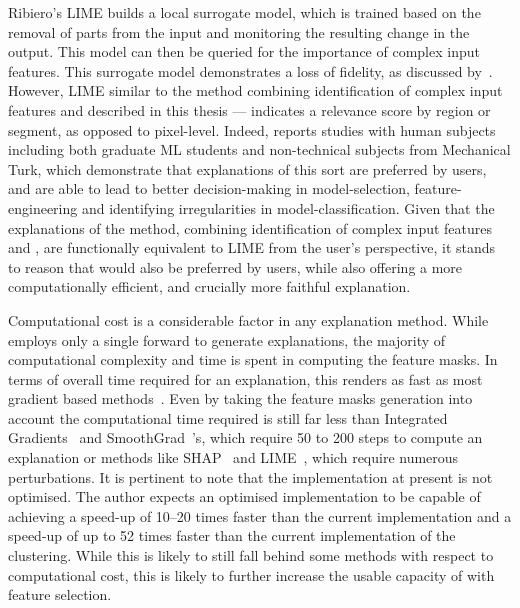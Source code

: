 Ribiero's LIME \cite{Ribeiro0G16} builds a local surrogate model, which is trained based on the removal of parts from the input and monitoring the resulting change in the output. This model can then be queried for the importance of complex input features. This surrogate model demonstrates a loss of fidelity, as discussed by~\cite{YehHSIR19}. However, LIME similar to the method combining identification of complex input features and \CTC\/ described in this thesis --- indicates a relevance score by region or segment, as opposed to pixel-level. Indeed, \cite{Ribeiro0G16} reports studies with human subjects including both graduate ML students and non-technical subjects from Mechanical Turk, which demonstrate that explanations of this sort are preferred by users, and are able to lead to better decision-making in model-selection, feature-engineering and identifying irregularities in model-classification. Given that the explanations of the method, combining identification of complex input features and \CTC\/, are functionally equivalent to LIME from the user's perspective, it stands to reason that \CTC\/ would also be preferred by users, while also offering a more computationally efficient, and crucially more faithful explanation.

Computational cost is a considerable factor in any explanation method. While \CTC\/ employs only a single forward to generate explanations, the majority of computational complexity and time is spent in computing the feature masks. In terms of overall time required for an explanation, this renders \CTC\/ as fast as most gradient based methods~\cite{SimonyanVZ13, SimonyanVZ13, SpringenbergDBR14, bach2015pixel, SelvarajuCDVPB20, SelvarajuCDVPB20, ChattopadhyaySH18, abs-1908-01224, SmilkovTKVW17}. Even by taking the feature masks generation into account the computational time required is still far less than Integrated Gradients~\cite{SundararajanTY17} and SmoothGrad~\cite{SmilkovTKVW17}'s, which require 50 to 200 steps to compute an explanation or methods like SHAP~\cite{LundbergL17} and LIME~\cite{Ribeiro0G16}, which require numerous perturbations. It is pertinent to note that the \CTC\/ implementation at present is not optimised. The author expects an optimised implementation to be capable of achieving a speed-up of 10--20 times faster than the current implementation and a speed-up of up to 52 times faster than the current implementation of the clustering. While this is likely to still fall behind some methods with respect to computational cost, this is likely to further increase the usable capacity of \CTC\/ with feature selection.



